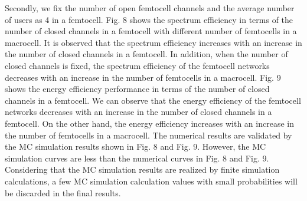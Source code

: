 \documentclass[10pt,final,journal,letterpaper,twoside,twocolumn]{IEEEtran}
\begin{document}
Secondly, we fix the number of open femtocell channels  and the average number of users as 4 in a femtocell. Fig. 8 shows the spectrum efficiency in terms of the number of closed channels in a femtocell with different number of femtocells in a macrocell.
It is observed that the spectrum efficiency increases with an increase in the number of closed
channels in a femtocell. In addition, when the number of closed channels is fixed, the
spectrum efficiency of the femtocell networks decreases with an increase in the number of femtocells
in a macrocell. Fig. 9 shows the energy efficiency performance in terms of
the number of closed channels in a femtocell. We can observe that the energy
efficiency of the femtocell networks decreases with an increase in the number of closed channels in a
femtocell. On the other hand, the energy efficiency increases with an increase in the number of
femtocells in a macrocell. The numerical results are validated by the MC simulation results shown in Fig. 8 and Fig. 9. However, the MC simulation curves are less than the numerical curves in Fig. 8 and Fig. 9. Considering that the MC simulation results are realized by finite simulation calculations, a few MC simulation calculation values with small probabilities will be discarded in the final results.
\end{document}
